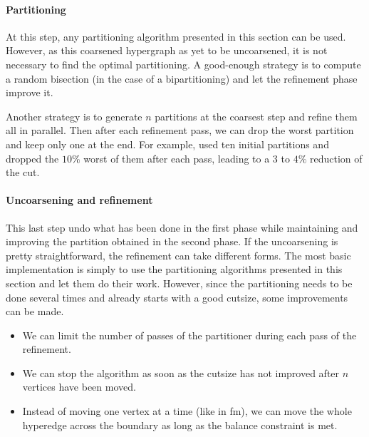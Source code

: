 \documentclass[11pt,a4paper]{report} %
\theoremstyle{customdef}
\begin{document}
\paragraph{Partitioning}
At this step, any partitioning algorithm presented in this section can be used.
However, as this coarsened hypergraph as yet to be uncoarsened, it is not necessary to find the optimal partitioning.
A good-enough strategy is to compute a random bisection (in the case of a bipartitioning) and let the refinement phase improve it.

Another strategy is to generate $n$ partitions at the coarsest step and refine them all in parallel.
Then after each refinement pass, we can drop the worst partition and keep only one at the end.
For example, \citet{Karypis1999} used ten initial partitions and dropped the $10\%$ worst of them after each pass, leading to a $3$ to $4\%$ reduction of the cut.


\paragraph{Uncoarsening and refinement}
This last step undo what has been done in the first phase while maintaining and improving the partition obtained in the second phase.
If the uncoarsening is pretty straightforward, the refinement can take different forms.
The most basic implementation is simply to use the partitioning algorithms presented in this section and let them do their work.
However, since the partitioning needs to be done several times and already starts with a good cutsize, some improvements can be made.

\begin{itemize}
	\item We can limit the number of passes of the partitioner during each pass of the refinement.
	\item We can stop the algorithm as soon as the cutsize has not improved after $n$ vertices have been moved.
	\item Instead of moving one vertex at a time (like in \gls{fm}), we can move the whole hyperedge across the boundary as long as the balance constraint is met.
\end{itemize}
\end{document}
